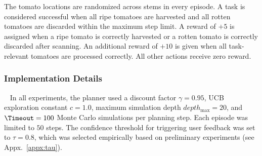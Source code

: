 The tomato locations are randomized across stems in every episode. A task is considered successful when all ripe tomatoes are harvested and all rotten tomatoes are discarded within the maximum step limit. A reward of $+5$ is assigned when a ripe tomato is correctly harvested or a rotten tomato is correctly discarded after scanning. An additional reward of $+10$ is given when all task-relevant tomatoes are processed correctly. All other actions receive zero reward.



\subsubsection{Implementation Details}~\label{exp:details}
In all experiments, the planner used a discount factor $\gamma=0.95$, UCB exploration constant $c=1.0$, maximum simulation depth $depth_{\max}=20$, and $\Timeout=100$ Monte Carlo simulations per planning step. Each episode was limited to $50$ steps. The confidence threshold for triggering user feedback was set to $\tau=0.8$, which was selected empirically based on preliminary experiments (see Appx.~\ref{appx:tau}).



